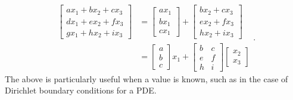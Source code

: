 \documentclass[11pt, letterpaper]{article}
\numberwithin{equation}{section}
\begin{document}
	\begin{equation}
		\label{eq:matrix-expansion}
		\begin{split}
			\begin{bmatrix}
				ax_1+bx_2+cx_3 \\
				dx_1+ex_2+fx_3 \\
				gx_1+hx_2+ix_3
			\end{bmatrix}
			&=
			\begin{bmatrix}
				ax_1 \\
				bx_1 \\
				cx_1
			\end{bmatrix}+\begin{bmatrix}
							  bx_2+cx_3 \\
							  ex_2+fx_3 \\
							  hx_2+ix_3
			\end{bmatrix}\\
			&=
			\begin{bmatrix}
				a \\
				b \\
				c
			\end{bmatrix}x_1 +
			\begin{bmatrix}
				b & c \\
				e & f \\
				h & i
			\end{bmatrix}\begin{bmatrix}
							 x_2 \\
							 x_3
			\end{bmatrix}
		\end{split}.
	\end{equation}
	The above is particularly useful when a value is known, such as in the case of Dirichlet boundary conditions for a PDE.

	
	
\end{document}
